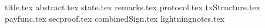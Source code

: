 \documentclass[11pt]{llncs}
\begin{document}
{title.tex}
\thispagestyle{plain}
{abstract.tex}
{state.tex}
{remarks.tex}
{protocol.tex}
{txStructure.tex}
{payfunc.tex}
{secproof.tex}
{combinedSign.tex}
{lightningnotes.tex}

\end{document}
